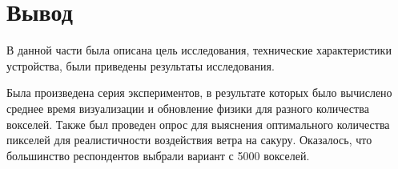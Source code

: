 \section*{Вывод}
В данной части была описана цель исследования, технические характеристики устройства, были приведены результаты исследования.

Была произведена серия экспериментов, в результате которых было вычислено среднее время визуализации и обновление физики для разного количества вокселей. Также был проведен опрос для выяснения оптимального количества пикселей для реалистичности воздействия ветра на сакуру. Оказалось, что большинство респондентов выбрали вариант с 5000 вокселей.
